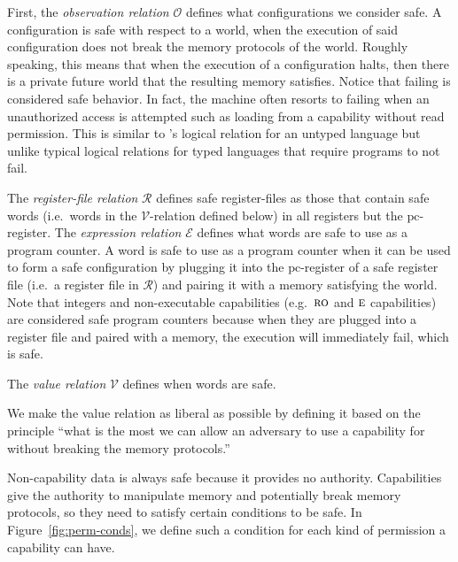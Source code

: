 \documentclass[format=acmsmall, review=true, screen=true]{acmart}
\renewcommand{\figurename}{Figure}
\newcommand{\pcreg}{\mathrm{pc}}
\newcommand{\asmType}{\plaindom{AsmType}}
\newcommand{\plaindom}[1]{\mathrm{#1}}
\newcommand{\UPred}[1]{\plaindom{UPred}(#1)}
\newcommand{\intr}[2]{\mathcal{#1}}
\newcommand{\valueintr}[1]{\intr{V}{#1}}
\newcommand{\exprintr}[1]{\intr{E}{#1}}
\newcommand{\regintr}[1]{\intr{R}{#1}}
\newcommand{\stdvr}{\valueintr{\asmType}}
\newcommand{\stder}{\exprintr{\asmType}}
\newcommand{\stdrr}{\regintr{\asmType}}
\newcommand{\observations}{\mathcal{O}}
\newcommand{\plainperm}[1]{\textsc{#1}}
\newcommand{\readonly}{\plainperm{ro}}
\newcommand{\entry}{\plainperm{e}}
\newcommand{\itoplassug}[1]{}
\begin{document}
First, the \emph{observation relation} $\observations$ defines what
configurations we consider safe. A configuration is safe
with respect to a world, when the execution of said configuration does not break
the memory protocols of the world. Roughly speaking, this means that when the
execution of a configuration halts, then there is a private future world that
the resulting memory satisfies. Notice that failing is considered safe behavior.
In fact, the machine often resorts to failing when an unauthorized access is
attempted such as loading from a capability without read permission. This is
similar to \citet{Devriese:2016ObjCap}'s logical relation for an untyped
language but unlike typical logical relations for typed languages that
require programs to not fail.

The \emph{register-file relation} $\stdrr$ defines safe register-files as those that contain safe words (i.e.\ words in the $\stdvr$-relation defined below) in all registers but the $\pcreg$-register.
The \emph{expression relation} $\stder$ defines what words are safe to use as a program counter.
A word is safe to use as a program counter when it can be used to form a safe configuration by plugging it into the $\pcreg$-register of a safe register file (i.e.\ a register file in $\stdrr$) and pairing it with a memory satisfying the world.
Note that integers and non-executable capabilities (e.g.\ $\readonly$ and $\entry$ capabilities) are considered safe program counters because when they are plugged into a register file and paired with a memory, the execution will immediately fail, which is safe.

The \emph{value relation} $\stdvr$ defines when words are safe.
\itoplassug{Explain why we use $\UPred{}$ with reference to the introduction of this section.}
We make the value relation as liberal as possible by defining it based on the principle ``what is the most we can allow an adversary to use a capability for without breaking the memory protocols.''

Non-capability data is always safe because it provides no authority.
Capabilities give the authority to manipulate memory and potentially break memory protocols, so they need to satisfy certain conditions to be safe.
In \figurename~\ref{fig:perm-conds}, we define such a condition for each kind of permission a capability can have.
\end{document}
